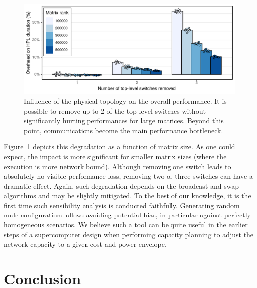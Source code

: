         \begin{figure}[htpb]
            \centering
            \includegraphics[width=\linewidth]{img/prediction/sensibility/topology/whatif_removing_switches.pdf}

            \caption{Influence of the physical topology on the overall performance. It is possible to remove up to 2
            of the top-level switches without significantly hurting performances for large matrices. Beyond this point,
            communications become the main performance bottleneck.}
            \label{fig:whatif_removing_switches}
        \end{figure}

        Figure~\ref{fig:whatif_removing_switches} depicts this degradation as a function of matrix size. As one could
        expect, the impact is more significant for smaller matrix sizes (where the execution is more network bound).
        Although removing one switch leads to absolutely no visible performance loss, removing two or three switches can
        have a dramatic effect. Again, such degradation depends on the broadcast and swap algorithms and may be slightly
        mitigated. To the best of our knowledge, it is the first time such sensibility analysis is conducted faithfully.
        Generating random node configurations allows avoiding potential bias, in particular against perfectly
        homogeneous scenarios. We believe such a tool can be quite useful in the earlier steps of a supercomputer design
        when performing capacity planning to adjust the network capacity to a given cost and power envelope.

\chapter{Conclusion}%
\label{chapter:prediction:conclusion}

